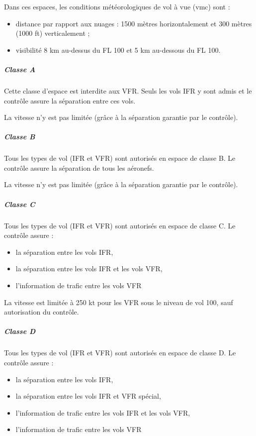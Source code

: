 		Dans ces espaces, les conditions météorologiques de vol à vue (\acrshort{vmc}) sont :
		\begin{itemize}
		\item distance par rapport aux nuages : 1500 mètres horizontalement et 300 mètres (1000 ft) verticalement ;
		\item visibilité 8 km au-dessus du FL 100 et 5 km au-dessous du FL 100. 
		\end{itemize}
		
		\subparagraph{Classe A}
		Cette classe d'espace est interdite aux VFR. Seuls les vols IFR y sont admis et le contrôle assure la séparation entre ces vols.
		
		
		La vitesse n'y est pas limitée (grâce à la séparation garantie par le contrôle).
		
		\subparagraph{Classe B}
		Tous les types de vol (IFR et VFR) sont autorisés en espace de classe B. Le contrôle assure la séparation de tous les aéronefs.
		
		
		La vitesse n'y est pas limitée (grâce à la séparation garantie par le contrôle).
		
		\subparagraph{Classe C}
		Tous les types de vol (IFR et VFR) sont autorisés en espace de classe C. Le contrôle assure :
		\begin{itemize}
		\item la séparation entre les vols IFR,
		\item la séparation entre les vols IFR et les vols VFR,
		\item l'information de trafic entre les vols VFR
		\end{itemize}
		
		
		La vitesse est limitée à 250 kt pour les VFR sous le niveau de vol 100, sauf autorisation du contrôle.
		
		\subparagraph{Classe D}\label{classeD}
		Tous les types de vol (IFR et VFR) sont autorisés en espace de classe D. Le contrôle assure :
		\begin{itemize}
		\item la séparation entre les vols IFR,
		\item la séparation entre les vols IFR et VFR spécial,
		\item l'information de trafic entre les vols IFR et les vols VFR,
		\item l'information de trafic entre les vols VFR
		\end{itemize}
		
